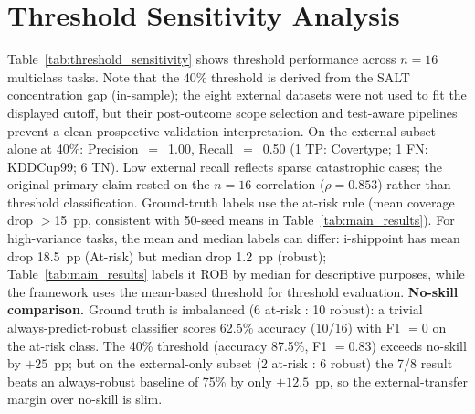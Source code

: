 \documentclass[accepted]{uai2026} %
\begin{document}
\section{Threshold Sensitivity Analysis}\label{app:threshold}

Table~\ref{tab:threshold_sensitivity} shows threshold performance across $n=16$ multiclass tasks. Note that the 40\% threshold is derived from the SALT concentration gap (in-sample); the eight external datasets were not used to fit the displayed cutoff, but their post-outcome scope selection and test-aware pipelines prevent a clean prospective validation interpretation. On the external subset alone at 40\%: Precision~$=$~1.00, Recall~$=$~0.50 (1 TP: Covertype; 1 FN: KDDCup99; 6 TN). Low external recall reflects sparse catastrophic cases; the original primary claim rested on the $n=16$ correlation ($\rho=0.853$) rather than threshold classification. Ground-truth labels use the at-risk rule (mean coverage drop $>$15~pp, consistent with 50-seed means in Table~\ref{tab:main_results}). For high-variance tasks, the mean and median labels can differ: i-shippoint has mean drop 18.5~pp (At-risk) but median drop 1.2~pp (robust); Table~\ref{tab:main_results} labels it ROB by median for descriptive purposes, while the framework uses the mean-based threshold for threshold evaluation. \textbf{No-skill comparison.} Ground truth is imbalanced (6 at-risk : 10 robust): a trivial always-predict-robust classifier scores 62.5\% accuracy (10/16) with F1 $=0$ on the at-risk class. The 40\% threshold (accuracy 87.5\%, F1 $=0.83$) exceeds no-skill by $+25$~pp; but on the external-only subset (2 at-risk : 6 robust) the 7/8 result beats an always-robust baseline of 75\% by only $+12.5$~pp, so the external-transfer margin over no-skill is slim.
\end{document}
